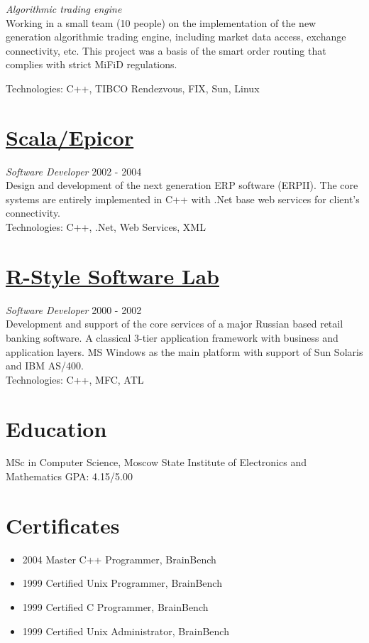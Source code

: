 \documentclass[margin, 10pt]{res}
\begin{document}
\begin{resume}
{\sl Algorithmic trading engine }\\
Working in a small team (10 people) on the implementation of the new generation algorithmic trading engine, including market data access, exchange connectivity, etc. This project was a 
basis of the smart order routing that complies with strict MiFiD regulations.  

Technologies: C++, TIBCO Rendezvous, FIX, Sun, Linux   

\section{\href{http://epicor.com}{Scala/Epicor}}
{\sl Software Developer} \hfill 2002 - 2004 \\
Design and development of the next generation ERP software (ERPII). The core systems are entirely implemented in C++ with .Net base web services for client's connectivity.\\
Technologies: C++, .Net, Web Services, XML 

\section{\href{http://softlab.ru}{R-Style Software Lab}}
{\sl Software Developer} \hfill 2000 - 2002 \\
Development and support of the core services of a major Russian based retail banking software. A classical 3-tier application framework with business and application layers. MS Windows as the main platform with support of Sun Solaris and IBM AS/400.\\
Technologies: C++, MFC, ATL 

\section{Education}
MSc in Computer Science, Moscow State Institute of Electronics and Mathematics GPA: 
4.15/5.00 


\section{Certificates}
\begin{itemize}
\item 2004 Master C++ Programmer, BrainBench  
\item 1999 Certified Unix Programmer, BrainBench  
\item 1999 Certified C Programmer, BrainBench  
\item 1999 Certified Unix Administrator, BrainBench 
\end{itemize} 


\end{resume}
\end{document}
